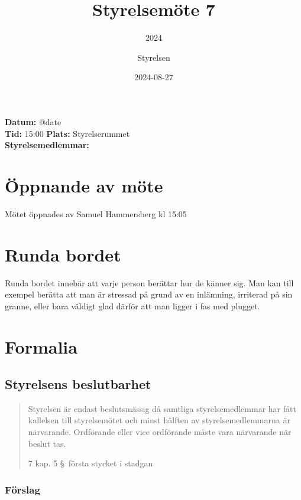\documentclass[protokoll]{dvd}
\begin{document}
\title{Styrelsemöte 7}
\subtitle{2024}
\author{Styrelsen}
\date{2024-08-27}


\textbf{Datum:} \csname @date\endcsname\\
\textbf{Tid:} 15:00
\textbf{Plats:} Styrelserummet\\
\textbf{Styrelsemedlemmar:}
\begin{närvarande_förtroendevalda}
\end{närvarande_förtroendevalda}

\section{Öppnande av möte}

Mötet öppnades av Samuel Hammersberg kl 15:05

\section{Runda bordet}

Runda bordet innebär att varje person berättar hur de känner sig.
Man kan till exempel berätta att man är stressad på grund av en inlämning, irriterad på sin granne, eller bara väldigt glad därför att man ligger i fas med plugget.

\section{Formalia}

\subsection{Styrelsens beslutbarhet}

\blockquote[7 kap. 5 \S~första stycket i stadgan][]{%
    Styrelsen är endast beslutsmässig då samtliga styrelsemedlemmar har fått kallelsen till styrelsemötet och minst hälften av styrelsemedlemmarna är närvarande.
    Ordförande eller vice ordförande måste vara närvarande när beslut tas.
}

\subsubsection*{Förslag}
\end{document}
